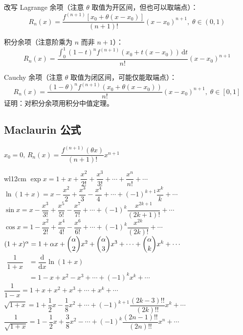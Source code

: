 \documentclass[12pt, a4paper, UTF8, openany]{ctexbook}
\newcommand{\dif}{\mathrm{d}}
\newcommand{\difk}[2]{{#1}^{(#2)}}
\begin{document}
        改写 Lagrange 余项（注意 $\theta$ 取值为开区间，但也可以取端点）：
        $$R_n(x) = \dfrac{\difk{f}{n + 1}\left[x_0 + \theta(x - x_0)\right]}{(n + 1)!}(x - x_0)^{n + 1}, \; \theta \in (0, 1)$$

        积分余项（注意阶乘为 $n$ 而非 $n + 1$）：
        $$R_n(x) = \dfrac{\int_{0}^{1} (1 - t)^n\difk{f}{n + 1}(x_0 + t(x - x_0))\,\dif t}{n!} (x - x_0)^{n + 1}$$

        Cauchy 余项（注意 $\theta$ 取值为闭区间，可能仅能取端点）：
        $$R_n(x) = \dfrac{(1 - \theta)^n\difk{f}{n + 1}(x_0 + \theta(x - x_0))}{n!}(x - x_0)^{n + 1}, \; \theta \in [0, 1]$$
        证明：对积分余项用积分中值定理。

        \subsection{Maclaurin 公式}
        $x_0 = 0, \, R_n(x) = \dfrac{\difk{f}{n + 1}(\theta x)}{(n + 1)!}x^{n + 1}$

        \begin{longtable}[h]{w{l}{12cm}}
            $\exp x = 1 + x + \dfrac{x^2}{2!} + \dfrac{x^3}{3!} + \cdots + \dfrac{x^n}{n!} + \cdots$ \\
            \addlinespace
            $\ln(1 + x) = x - \dfrac{x^2}{2} + \dfrac{x^3}{3} - \dfrac{x^4}{4} 
                + \cdots + (-1)^{k + 1}\dfrac{x^k}{k} + \cdots$ \\
            \midrule
            $\sin x = x - \dfrac{x^3}{3!} + \dfrac{x^5}{5!} - \dfrac{x^7}{7!} 
                        + \cdots + (-1)^{k}\dfrac{x^{2k + 1}}{(2k + 1)!} + \cdots$ \\
            \addlinespace
            $\cos x = 1 - \dfrac{x^2}{2!} + \dfrac{x^4}{4!} - \dfrac{x^6}{6!}
                        + \cdots + (-1)^{k}\dfrac{x^{2k}}{(2k)!} + \cdots$ \\
            \midrule
            $(1 + x)^\alpha = 1 + \alpha x + \dbinom{\alpha}{2}x^2 + \dbinom{\alpha}{3}x^3 
                + \cdots + \dbinom{\alpha}{k}x^k + \cdots$ \\
            \midrule
            $\begin{aligned}
                \dfrac{1}{1 + x} &= \dfrac{\dif}{\dif x}\ln(1 + x) \\
                    &= 1 - x + x^2 - x^3 + \cdots + (-1)^kx^k + \cdots
            \end{aligned}$ \\
            $\dfrac{1}{1 - x} = 1 + x + x^2 + x^3 + \cdots + x^k + \cdots$ \\
            \addlinespace
            $\sqrt{1 + x} = 1 + \dfrac{1}{2}x - \dfrac{1}{8}x^2 + \cdots 
                + (-1)^{k + 1}\dfrac{(2k - 3)!!}{(2k)!!}x^k + \cdots$ \\
            \addlinespace
            $\dfrac{1}{\sqrt{1 + x}} = 1 - \dfrac{1}{2}x + \dfrac{3}{8}x^2 
                - \cdots + (-1)^k\dfrac{(2n - 1)!!}{(2n)!!}x^n + \cdots$
        \end{longtable}
        
\end{document}

